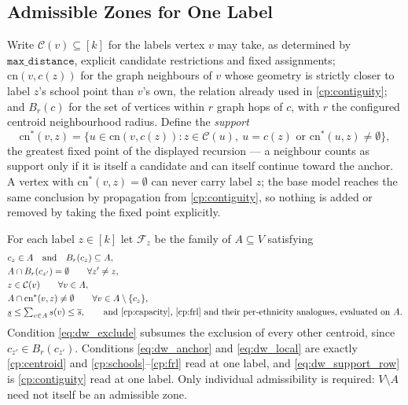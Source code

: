 \documentclass{article}
\begin{document}
\subsection{Admissible Zones for One Label}
\label{app:dw_families}

Write $\mathcal C(v) \subseteq [k]$ for the labels vertex $v$ may take, as
determined by $\texttt{max\_distance}$, explicit candidate restrictions and
fixed assignments; $\text{cn}(v, c(z))$ for the graph neighbours of $v$ whose
geometry is strictly closer to label $z$'s school point than $v$'s own, the
relation already used in \eqref{cp:contiguity}; and $B_r(c)$ for the set of
vertices within $r$ graph hops of $c$, with $r$ the configured centroid
neighbourhood radius. Define the \emph{support}
\begin{equation}\label{eq:dw_support}
\text{cn}^{*}(v, z) = \big\{ u \in \text{cn}(v, c(z)) : z \in \mathcal C(u),
\ u = c(z) \text{ or } \text{cn}^{*}(u, z) \neq \emptyset \big\},
\end{equation}
the greatest fixed point of the displayed recursion --- a neighbour counts as
support only if it is itself a candidate and can itself continue toward the
anchor. A vertex with $\text{cn}^{*}(v,z) = \emptyset$ can never carry label
$z$; the base model reaches the same conclusion by propagation from
\eqref{cp:contiguity}, so nothing is added or removed by taking the fixed point
explicitly.

For each label $z \in [k]$ let $\mathcal F_z$ be the family of $A \subseteq V$
satisfying
\begin{align}
& c_z \in A \quad\text{and}\quad B_r(c_z) \subseteq A, \label{eq:dw_anchor} \\
& A \cap B_r(c_{z'}) = \emptyset \qquad \forall z' \neq z, \label{eq:dw_exclude} \\
& z \in \mathcal C(v) \qquad \forall v \in A, \label{eq:dw_candidacy} \\
& A \cap \text{cn}^{*}(v, z) \neq \emptyset \qquad \forall v \in A \setminus \{c_z\}, \label{eq:dw_support_row} \\
& \underline{s} \leq \textstyle\sum_{v \in A} s(v) \leq \overline{s},
\qquad \text{and \eqref{cp:capacity}, \eqref{cp:frl} and their per-ethnicity
analogues, evaluated on } A. \label{eq:dw_local}
\end{align}
Condition \eqref{eq:dw_exclude} subsumes the exclusion of every other centroid,
since $c_{z'} \in B_r(c_{z'})$. Conditions \eqref{eq:dw_anchor} and
\eqref{eq:dw_local} are exactly \eqref{cp:centroid} and
\eqref{cp:schools}--\eqref{cp:frl} read at one label, and
\eqref{eq:dw_support_row} is \eqref{cp:contiguity} read at one label. Only
individual admissibility is required: $V \setminus A$ need not itself be an
admissible zone.
\end{document}

